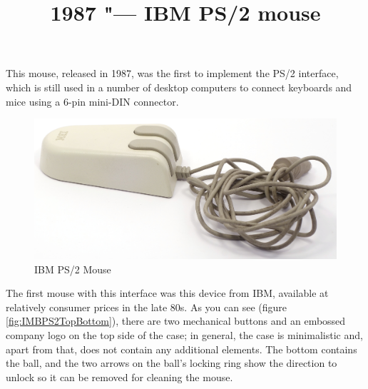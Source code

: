\documentclass[11pt, a4paper]{article}
\begin{document}
\title{1987 "--- IBM PS/2 mouse}
\date{}
\maketitle
{}
This mouse, released in 1987, was the first to implement the PS/2 interface, which is still used in a number of desktop computers to connect keyboards and mice using a 6-pin mini-DIN connector.

\begin{figure}[h]
    \centering
    \includegraphics[scale=0.6]{1987_ibm_ps2_mouse/num0.JPG}
    \caption{IBM PS/2 Mouse}
    \label{fig:IMBPS2Pic}
\end{figure}

The first mouse with this interface was this device from IBM, available at relatively consumer prices in the late 80s. As you can see (figure \ref{fig:IMBPS2TopBottom}), there are two mechanical buttons and an embossed company logo on the top side of the case; in general, the case is minimalistic and, apart from that, does not contain any additional elements. The bottom contains the ball, and the two arrows on the ball's locking ring show the direction to unlock so it can be removed for cleaning the mouse.
\end{document}
